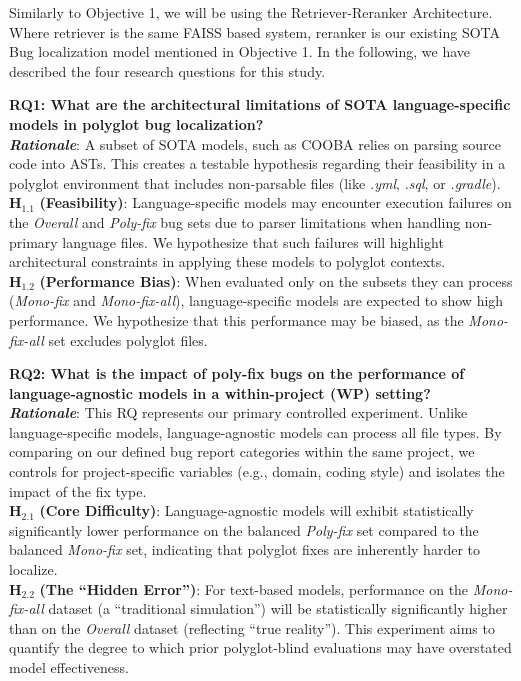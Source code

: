 \documentclass[12pt,table,xcdraw]{article}
\begin{document}
Similarly to Objective 1, we will be using the Retriever-Reranker Architecture. Where retriever is the same FAISS based system, reranker is our existing SOTA Bug localization model mentioned in Objective 1. In the following, we have described the four research questions for this study.

\textbf{RQ1: What are the architectural limitations of SOTA language-specific models in polyglot bug localization?} \\
\textit{\textbf{Rationale}}: A subset of SOTA models, such as COOBA relies on parsing source code into ASTs. This creates a testable hypothesis regarding their feasibility in a polyglot environment that includes non-parsable files (like \textit{.yml}, \textit{.sql}, or \textit{.gradle}). \\
$\boldsymbol{H_{1.1}}$ \textbf{(Feasibility)}: Language-specific models may encounter execution failures on the \textit{Overall} and \textit{Poly-fix} bug sets due to parser limitations when handling non-primary language files. We hypothesize that such failures will highlight architectural constraints in applying these models to polyglot contexts. \\
$\boldsymbol{H_{1.2}}$ \textbf{(Performance Bias)}: When evaluated only on the subsets they can process (\textit{Mono-fix} and \textit{Mono-fix-all}), language-specific models are expected to show high performance. We hypothesize that this performance may be biased, as the \textit{Mono-fix-all} set excludes polyglot files.


\textbf{RQ2: What is the impact of poly-fix bugs on the performance of language-agnostic models in a within-project (WP) setting?} \\
\textit{\textbf{Rationale}}: This RQ represents our primary controlled experiment. Unlike language-specific models, language-agnostic models can process all file types. By comparing on our defined bug report categories within the same project, we controls for project-specific variables (e.g., domain, coding style) and isolates the impact of the fix type. \\
$\boldsymbol{H_{2.1}}$ \textbf{(Core Difficulty)}: Language-agnostic models will exhibit statistically significantly lower performance on the balanced \textit{Poly-fix} set compared to the balanced \textit{Mono-fix} set, indicating that polyglot fixes are inherently harder to localize.\\
$\boldsymbol{H_{2.2}}$ \textbf{(The ``Hidden Error'')}: For text-based models, performance on the \textit{Mono-fix-all} dataset (a ``traditional simulation'') will be statistically significantly higher than on the \textit{Overall} dataset (reflecting ``true reality''). This experiment aims to quantify the degree to which prior polyglot-blind evaluations may have overstated model effectiveness.
\end{document}
